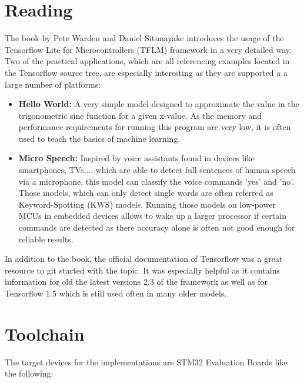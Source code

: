 \documentclass[oneside]{tum-book}
\begin{document}
\section{Reading}

The book by Pete Warden and Daniel Situnayake introduces the usage of the Tensorflow Lite for Microcontrollers (TFLM) framework in a very detailed way. Two of the practical applications, which are all referencing examples located in the Tensorflow source tree, are especially interesting as they are supported a a large number of platforms:

\begin{itemize}
    \item \textbf{Hello World:} A very simple model designed to approximate the value in the trigonometric sine function for a given x-value. As the memory and performance requirements for running this program are very low, it is often used to teach the basics of machine learning.
    \item \textbf{Micro Speech:} Inspired by voice assistants found in devices like smartphones, TVs,... which are able to detect full sentences of human speech via a microphone, this model can classify the voice commands 'yes' and 'no'. Those models, which can only detect single words are often referred as Keyword-Spotting (KWS) models. Running those models on low-power MCUs in embedded devices allows to wake up a larger processor if certain commands are detected as there accuracy alone is often not good enough for reliable results. 
\end{itemize}

In addition to the book, the official documentation of Tensorflow was a great resource to git started with the topic. It was especially helpful as it contains information for old the latest versions 2.3 of the framework as well as for Tensorflow 1.5 which is still used often in many older models.

\section{Toolchain}

The target devices for the implementations are STM32 Evaluation Boards like the following:
\end{document}
